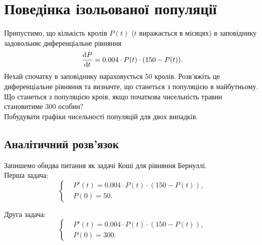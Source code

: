 




\tableofcontents

\section{Поведінка ізольованої популяції}

Припустимо, що кількість кролів $P(t)$ ($t$ виражається в місяцях) в заповіднику задовольняє диференціальне рівняння \[ \frac{\mathop{}\!\mathrm{d} P}{\mathop{}\!\mathrm{d} t} = 0.004 \cdot P(t) \cdot (150 - P(t)). \] Нехай спочатку в заповіднику нараховується 50 кролів. Розв'яжіть це диференціальне рівняння та визначте, що станеться з популяцією в майбутньому. \\

Що станеться з популяцією кроів, якщо початкова чисельність травин становитиме 300 особин? \\

Побудувати графіки чисельності популяцій для двох випадків.

\subsection{Аналітичний розв'язок}

Запишемо обидва питання як задачі Коші для рівняння Бернуллі. \\

Перша задача:
\begin{equation*}
	\left\{
		\begin{aligned}
			& P'(t) = 0.004 \cdot P(t) \cdot (150 - P(t)), \\
			& P(0) = 50.
		\end{aligned}
	\right.
\end{equation*}

Друга задача:
\begin{equation*}
	\left\{
		\begin{aligned}
			& P'(t) = 0.004 \cdot P(t) \cdot (150 - P(t)), \\
			& P(0) = 300.
		\end{aligned}
	\right.
\end{equation*}


